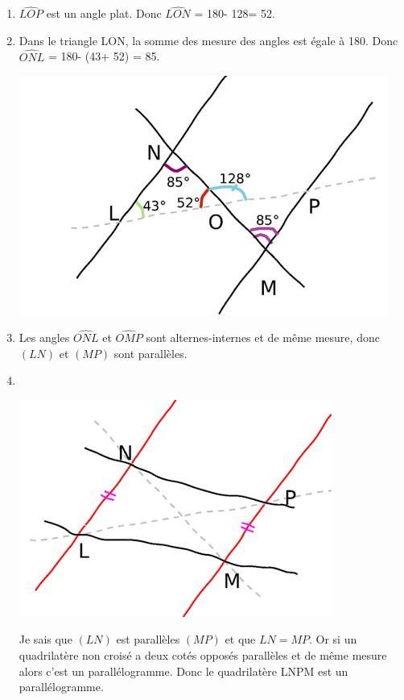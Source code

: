 \documentclass[12pt,a4paper]{article}
\begin{document}
\begin{enumerate}[label=\alph*.]
	\item $\widehat{LOP}$ est un angle plat. Donc $\widehat{LON}$ = 180\degree  - 128\degree = 52\degree .
	
	\item
	
		Dans le triangle LON, la somme des mesure des angles est égale à 180\degree . Donc $\widehat{ONL}$ = 180\degree  - (43\degree  +  52\degree ) = 85\degree .
		
		\begin{center}
			\includegraphics[scale=0.7]{ex25_1}
		\end{center}
	
	\item Les angles $\widehat{ONL}$ et $\widehat{OMP}$ sont alternes-internes et de même mesure, donc $(LN)$ et $(MP)$ sont parallèles.
	
	
	\item \ 
	\begin{center}
		\includegraphics[scale=0.6]{ex25_2}
	\end{center}

	Je sais que $(LN)$ est parallèles $(MP)$  et que $LN = MP$.
	Or si un quadrilatère non croisé a deux cotés opposés parallèles et de même mesure alors c'est un parallélogramme.
	Donc le quadrilatère LNPM est un parallélogramme.
	 
\end{enumerate}
\end{document}
